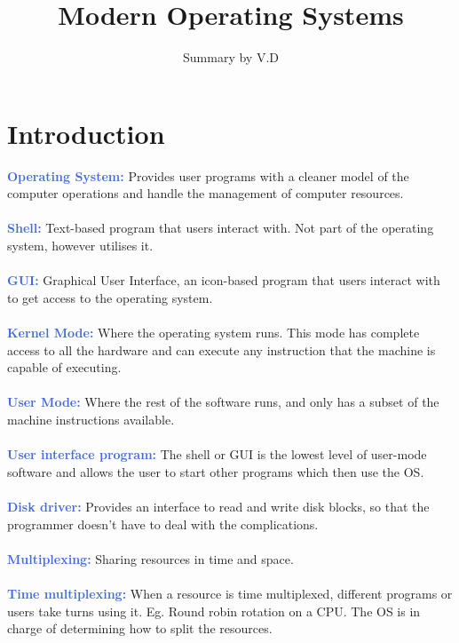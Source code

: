 \documentclass[a4paper,10pt]{article}
\title{Modern Operating Systems}
\author{Summary by V.D}
\begin{document}
\maketitle

\section{Introduction}
\textcolor{RoyalBlue}{\textbf{Operating System:}} Provides user programs with a cleaner model of the computer operations and handle the management of computer resources.\\\\
\textcolor{RoyalBlue}{\textbf{Shell:}} Text-based program that users interact with. Not part of the operating system, however utilises it. \\\\ 
\textcolor{RoyalBlue}{\textbf{GUI:}} Graphical User Interface, an icon-based program that users interact with to get access to the operating system. \\\\
\textcolor{RoyalBlue}{\textbf{Kernel Mode:}} Where the operating system runs. This mode has complete access to all the hardware and can execute any instruction that the machine is capable of executing. \\\\
\textcolor{RoyalBlue}{\textbf{User Mode:}} Where the rest of the software runs, and only has a subset of the machine instructions available. \\\\
\textcolor{RoyalBlue}{\textbf{User interface program:}} The shell or GUI is the lowest level of user-mode software and allows the user to start other programs which then use the OS. \\\\
\textcolor{RoyalBlue}{\textbf{Disk driver:}} Provides an interface to read and write disk blocks, so that the programmer doesn't have to deal with the complications. \\\\
\textcolor{RoyalBlue}{\textbf{Multiplexing:}} Sharing resources in time and space. \\\\ 
\textcolor{RoyalBlue}{\textbf{Time multiplexing:}} When a resource is time multiplexed, different programs or users take turns using it. Eg. Round robin rotation on a CPU. The OS is in charge of determining how to split the resources. \\\\
\end{document}
